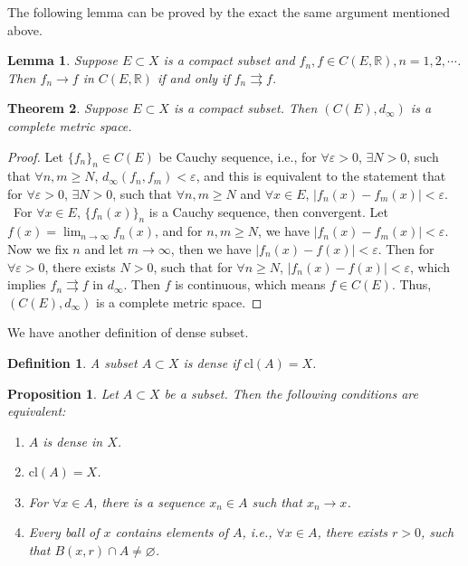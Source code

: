 \documentclass[12pt,leqno]{amsart}
\newtheorem{definition}{Definition}[section]
\newtheorem{theorem}{Theorem}[section]
\newtheorem{lemma}[theorem]{Lemma}
\newtheorem{proposition}{Proposition}[section]
\theoremstyle{definition}
\numberwithin{equation}{subsection}
\begin{document}
The following lemma can be proved by the exact the same argument mentioned above.

\begin{lemma}
Suppose $E\subset X$ is a compact subset and $f_n,f\in C(E,\mathbb{R}), n = 1,2,\cdots$. Then $f_n\to f$ in $C(E,\mathbb{R})$ if and only if $f_n\rightrightarrows f$.
\end{lemma}

\begin{theorem}
Suppose $E\subset X$ is a compact subset. Then $\left(C(E), d_\infty\right)$ is a complete metric space.
\end{theorem}
\begin{proof}
Let $\{f_n\}_n\in C(E)$ be Cauchy sequence, i.e., for $\forall \varepsilon > 0$, $\exists N > 0$, such that $\forall n,m \geq N$, $d_\infty(f_n,f_m) < \varepsilon$, and this is equivalent to the statement that for $\forall \varepsilon > 0$, $\exists N > 0$, such that $\forall n,m \geq N$ and $\forall x\in E$, $\left|f_n(x) - f_m(x)\right| < \varepsilon$. \\
\hspace*{1em}\, For $\forall x\in E$, $\{f_n(x)\}_n$ is a Cauchy sequence, then convergent. Let $f(x) = \lim_{n\to\infty}f_n(x)$, and for $n,m\geq N$, we have $\left|f_n(x) - f_m(x)\right| < \varepsilon$. Now we fix $n$ and let $m\to\infty$, then we have $\left|f_n(x) - f(x)\right| < \varepsilon$. Then for $\forall \varepsilon > 0$, there exists $N > 0$, such that for $\forall n\geq N$, $\left|f_n(x) - f(x)\right| < \varepsilon$, which implies $f_n\rightrightarrows f$ in $d_\infty$. Then $f$ is continuous, which means $f\in C(E)$. Thus, $\left(C(E), d_\infty\right)$ is a complete metric space.
\end{proof}

\medskip

We have another definition of dense subset.

\begin{definition}
A subset $A\subset X$ is dense if $\text{cl}(A) = X$.
\end{definition}

\begin{proposition}
Let $A\subset X$ be a subset. Then the following conditions are equivalent:
\begin{enumerate}
    \item $A$ is dense in $X$.
    \item $\text{cl}(A) = X$.
    \item For $\forall x\in A$, there is a sequence $x_n\in A$ such that $x_n\to x$.
    \item Every ball of $x$ contains elements of $A$, i.e., $\forall x\in A$, there exists $r > 0$, such that $B(x,r)\cap A\neq\varnothing$.
\end{enumerate}
\end{proposition}
\end{document}

